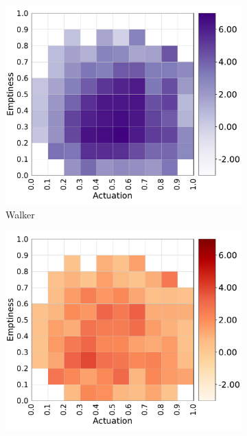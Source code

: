 \begin{figure}
    \centering
    \begin{subfigure}[b]{0.3\textwidth}
         \centering
         \includegraphics[scale=0.3]{images/multitasking/walker.pdf}
         \caption{Walker}
         \label{walker_a}
     \end{subfigure}
     \hfill
     \begin{subfigure}[b]{0.3\textwidth}
         \centering
         \includegraphics[scale=0.3]{images/multitasking/walker_p.pdf}

\end{subfigure}
\end{figure}
